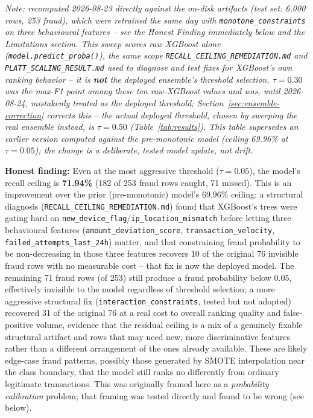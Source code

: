 \documentclass[conference]{IEEEtran}
\begin{document}
\textit{Note: recomputed 2026-08-23 directly against the on-disk artifacts
(test set: 6{,}000 rows, 253 fraud), which were retrained the same day with
\texttt{monotone\_constraints} on three behavioural features -- see the
Honest Finding immediately below and the Limitations section. This sweep
scores raw XGBoost alone (\texttt{model.predict\_proba()}), the same
scope \texttt{RECALL\_CEILING\_REMEDIATION.md} and
\texttt{PLATT\_SCALING\_RESULT.md} used to diagnose and test fixes for
XGBoost's own ranking behavior -- it is \textbf{not} the deployed
ensemble's threshold selection. $\tau=0.30$ was the max-F1 point among
these ten raw-XGBoost values and was, until 2026-08-24, mistakenly treated
as the deployed threshold; Section~\ref{sec:ensemble-correction} corrects
this -- the actual deployed threshold, chosen by sweeping the real
ensemble instead, is $\tau=0.50$ (Table~\ref{tab:results}). This table
supersedes an earlier version computed against the pre-monotonic model
(ceiling 69.96\% at $\tau=0.05$); the change is a deliberate, tested model
update, not drift.}

\textbf{Honest finding:} Even at the most aggressive threshold
($\tau = 0.05$), the model's recall ceiling is \textbf{71.94\%} (182 of 253
fraud rows caught, 71 missed). This is an improvement over the prior
(pre-monotonic) model's 69.96\% ceiling: a structural diagnosis
(\texttt{RECALL\_CEILING\_REMEDIATION.md}) found that XGBoost's trees were
gating hard on \texttt{new\_device\_flag}/\texttt{ip\_location\_mismatch}
before letting three behavioural features
(\texttt{amount\_deviation\_score}, \texttt{transaction\_velocity},
\texttt{failed\_attempts\_last\_24h}) matter, and that constraining fraud
probability to be non-decreasing in those three features recovers 10 of the
original 76 invisible fraud rows with no measurable cost -- that fix is now
the deployed model. The remaining 71 fraud rows (of 253) still produce a
fraud probability below 0.05, effectively invisible to the model regardless
of threshold selection; a more aggressive structural fix
(\texttt{interaction\_constraints}, tested but not adopted) recovered 31 of
the original 76 at a real cost to overall ranking quality and false-positive
volume, evidence that the residual ceiling is a mix of a genuinely fixable
structural artifact and rows that may need new, more discriminative features
rather than a different arrangement of the ones already available. These
are likely edge-case fraud patterns, possibly those generated by SMOTE
interpolation near the class boundary, that the model still ranks no
differently from ordinary legitimate transactions. This was originally
framed here as a \textit{probability calibration} problem; that framing was
tested directly and found to be wrong (see below).
\end{document}
